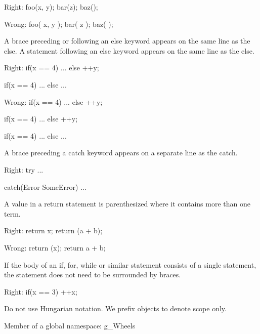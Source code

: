 Right:
\startCodeExample
\starttyping
foo(x, y);
bar(z);
baz();
\stoptyping
\stopCodeExample

Wrong:
\startCodeExample
\starttyping
foo( x, y );
bar( z );
baz( );
\stoptyping
\stopCodeExample

\item
A brace preceding or following an else keyword appears on the same line as the else. A statement following an else keyword appears on the same line as the else. 

Right:
\startCodeExample
\starttyping
if(x == 4)
{
    ...
}
else
  ++y;

if(x == 4)
{
    ...
}
else
{
    ...
}
\stoptyping
\stopCodeExample

Wrong:
\startCodeExample
\starttyping
if(x == 4) {
    ...
}
else ++y;

if(x == 4) {
    ...
} else ++y;

if(x == 4) {
    ...
}
else {
    ...
}
\stoptyping
\stopCodeExample

\item
A brace preceding a catch keyword appears on a separate line as the catch. 

Right:
\startCodeExample
\starttyping
try
{
    ...
}

catch(Error SomeError)
{
    ...
}
\stoptyping
\stopCodeExample

\item
A value in a return statement is parenthesized where it contains more than one term.

Right:
\startCodeExample
\starttyping
return x;
return (a + b);
\stoptyping
\stopCodeExample

Wrong:
\startCodeExample
\starttyping
return (x);
return a + b;
\stoptyping
\stopCodeExample

\item
If the body of an if, for, while or similar statement consists of a single statement, the statement does not need to be surrounded by braces.


Right:
\startCodeExample
\starttyping
if(x == 3)
  ++x;
\stoptyping
\stopCodeExample

\stopitemize



\startitemize[3]
\setupwhitespace[big]
\item
Do not use Hungarian notation. We prefix objects to denote scope only.


Member of a global namespace:
\startCodeExample
\starttyping
g_Wheels
\stoptyping
\stopCodeExample

